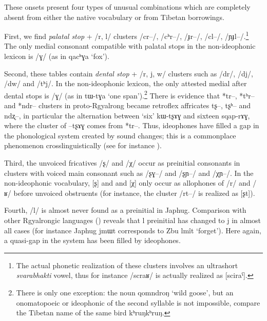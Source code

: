 \documentclass[oldfontcommands,oneside,a4paper,11pt]{article}
\newcommand{\ipa}[1]{{\phon \mbox{#1}}} %
\begin{document}

These onsets present four types of unusual combinations  which are completely absent from either the native vocabulary or from Tibetan borrowings.

First,  we find \textit{palatal stop} + /\ipa{r}, \ipa{l}/ clusters /\ipa{cr--}/, /\ipa{cʰr--}/, /\ipa{ɟr--}/, /\ipa{cl--}/, /\ipa{ɲɟl--}/.\footnote{The actual phonetic realization of these clusters involves an ultrashort \textit{svarabhakti} vowel, thus for instance /\ipa{scraʁ}/ is actually realized as [sciraˁ].} The only medial consonant compatible with palatal stops in the non-ideophonic lexicon is /\ipa{ɣ}/ (as in \ipa{qacʰɣa} `fox').

Second, these tables contain  \textit{dental stop} + /\ipa{r}, \ipa{j}, \ipa{w}/ clusters such as /\ipa{dr}/, /\ipa{dj}/,  /\ipa{dw}/ and /\ipa{tʰj}/. In the non-ideophonic lexicon, the only attested medial  after dental stops is /\ipa{ɣ}/ (as in \ipa{tɯ-tɣa} `one span').\footnote{There is only one  exception: the noun \ipa{qomndroŋ} `wild goose', but an onomatopoeic  or ideophonic of the second syllable is not impossible, compare the Tibetan name of the same bird \ipa{kʰruŋkʰruŋ}.} There is evidence that  *tr--, *tʰr-- and *ndr-- clusters in proto-Rgyalrong became retroflex affricates \ipa{tʂ--}, \ipa{tʂʰ--} and \ipa{ndʐ--}, in particular the alternation between `six' \ipa{kɯ-tʂɤɣ} and sixteen \ipa{sqap-rɤɣ}, where the cluster of \ipa{--tʂɤɣ} comes from *tr--. Thus,   ideophones have filled a gap in the phonological system created by sound changes; this is a commonplace phenomenon crosslinguistically (see for instance \citealt{diffloth80expressive}).

Third, the unvoiced fricatives /\ipa{ʂ}/ and /\ipa{χ}/ occur  as preinitial consonants in clusters with voiced main consonant such as /\ipa{ʂɣ--}/ and /\ipa{ʂɲ--}/ and /\ipa{χɲ--}/. In the non-ideophonic vocabulary, [ʂ] and and [χ] only occur as allophones of /\ipa{r}/ and /\ipa{ʁ}/ before unvoiced obstruents (for instance, the cluster /\ipa{rt--}/ is realized as [ʂt]). 

Fourth, /\ipa{l}/ is almost never found as a preinitial in Japhug. Comparison with other Rgyalrongic languages (\citealt[271-2]{jacques04these}) reveals that \ipa{l} preinitial has changed to \ipa{j} in almost all cases (for instance Japhug \ipa{jmɯt} corresponds to Zbu \ipa{lmît} `forget'). Here again, a quasi-gap in the system has been filled by ideophones.
\end{document}
